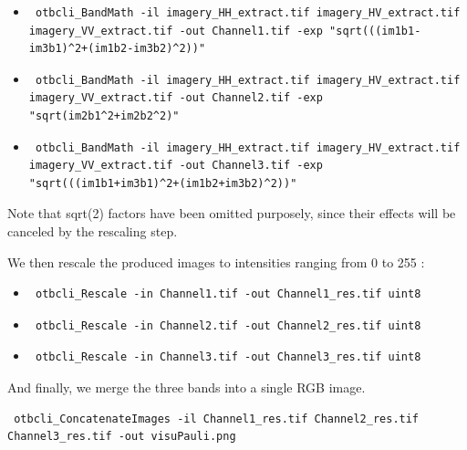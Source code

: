 \begin{itemize}
\item \begin{verbatim} otbcli_BandMath -il imagery_HH_extract.tif imagery_HV_extract.tif imagery_VV_extract.tif -out Channel1.tif -exp "sqrt(((im1b1-im3b1)^2+(im1b2-im3b2)^2))" \end{verbatim}
									  
\item \begin{verbatim} otbcli_BandMath -il imagery_HH_extract.tif imagery_HV_extract.tif imagery_VV_extract.tif -out Channel2.tif -exp "sqrt(im2b1^2+im2b2^2)" \end{verbatim}
									  
\item \begin{verbatim} otbcli_BandMath -il imagery_HH_extract.tif imagery_HV_extract.tif imagery_VV_extract.tif -out Channel3.tif -exp "sqrt(((im1b1+im3b1)^2+(im1b2+im3b2)^2))" \end{verbatim}
\end{itemize}

Note that sqrt(2) factors have been omitted purposely, since their effects will be canceled by the rescaling step.


We then rescale the produced images to intensities ranging from 0 to 255 :

\begin{itemize}
\item \begin{verbatim} otbcli_Rescale -in Channel1.tif -out Channel1_res.tif uint8 \end{verbatim}
									  
\item \begin{verbatim} otbcli_Rescale -in Channel2.tif -out Channel2_res.tif uint8 \end{verbatim}
									  
\item \begin{verbatim} otbcli_Rescale -in Channel3.tif -out Channel3_res.tif uint8 \end{verbatim}
\end{itemize}

And finally, we merge the three bands into a single RGB image.

\begin{verbatim} otbcli_ConcatenateImages -il Channel1_res.tif Channel2_res.tif Channel3_res.tif -out visuPauli.png \end{verbatim}

